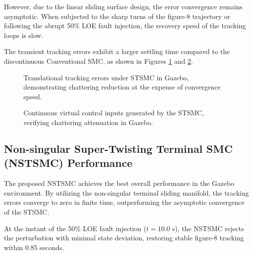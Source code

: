 However, due to the linear sliding surface design, the error convergence remains asymptotic. When subjected to the sharp turns of the figure-8 trajectory or following the abrupt 50\% LOE fault injection, the recovery speed of the tracking loops is slow. 

The transient tracking errors exhibit a larger settling time compared to the discontinuous Conventional SMC, as shown in Figures \ref{fig:gazebo_stsmc_errors} and \ref{fig:gazebo_stsmc_inputs}.

\begin{figure}[htbp]
\centering
{}
\caption{Translational tracking errors under STSMC in Gazebo, demonstrating chattering reduction at the expense of convergence speed.}
\label{fig:gazebo_stsmc_errors}
\end{figure}

\begin{figure}[htbp]
\centering
{}
\caption{Continuous virtual control inputs generated by the STSMC, verifying chattering attenuation in Gazebo.}
\label{fig:gazebo_stsmc_inputs}
\end{figure}

\subsection{Non-singular Super-Twisting Terminal SMC (NSTSMC) Performance}
The proposed NSTSMC achieves the best overall performance in the Gazebo environment. By utilizing the non-singular terminal sliding manifold, the tracking errors converge to zero in finite time, outperforming the asymptotic convergence of the STSMC. 

At the instant of the 50\% LOE fault injection ($t = 10.0$ s), the NSTSMC rejects the perturbation with minimal state deviation, restoring stable figure-8 tracking within 0.85 seconds. 

